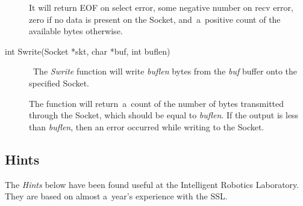 \documentclass[12pt]{article}
\def\SSL{{\small SSL}}
\begin{document}
\begin{description}
    It will return EOF on select error, some negative number on recv error,
    zero if no data is present on the Socket, and~a~positive count of the
    available bytes otherwise.

\item[int Swrite(Socket *skt, char *buf, int buflen)] \     The {\em Swrite} function will write {\em buflen} bytes from the {\em buf}
    buffer onto the specified Socket.

    The function will return~a~count of the number of bytes transmitted through
    the Socket, which should be equal to {\em buflen}.  If the output is less
    than {\em buflen}, then an error occurred while writing to the Socket.

\end{description}


\subsection{Hints}

The {\em Hints} below have been found useful at the Intelligent Robotics
Laboratory.  They are based on almost a~year's experience with the \SSL.
\end{document}
